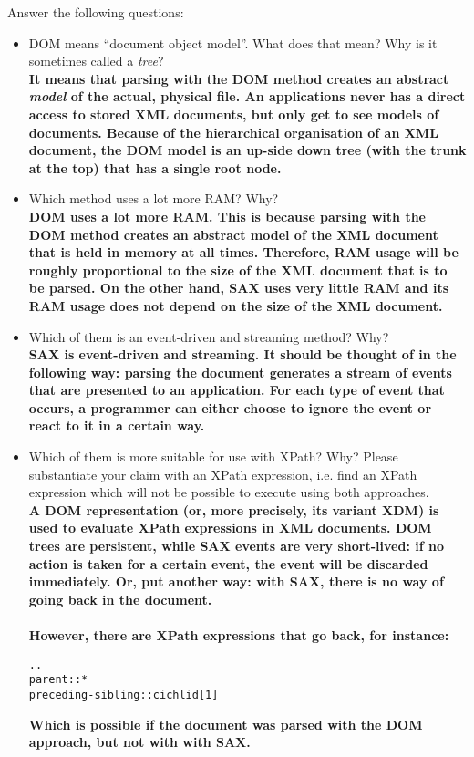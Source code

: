 \documentclass[a4paper, 12pt]{scrartcl}
\begin{document}
Answer the following questions:
\begin{itemize}
\item DOM means ``document object model''. What does that mean? Why is it sometimes called a \textit{tree}?
\vspace{0.5cm} \\
\textbf{It means that parsing with the DOM method creates an abstract \textit{model} of the actual, physical file. An applications never has a direct access to stored XML documents, but only get to see models of documents. Because of the hierarchical organisation of an XML document, the DOM model is an up-side down tree (with the trunk at the top) that has a single root node.}
\item Which method uses a lot more RAM? Why?
\vspace{0.5cm} \\
\textbf{DOM uses a lot more RAM. This is because parsing with the DOM method creates an abstract model of the XML document that is held in memory at all times. Therefore, RAM usage will be roughly proportional to the size of the XML document that is to be parsed. On the other hand, SAX uses very little RAM and its RAM usage does not depend on the size of the XML document.
}
\item Which of them is an event-driven and streaming method? Why?
\vspace{0.5cm} \\
\textbf{SAX is event-driven and streaming. It should be thought of in the following way: parsing the document generates a stream of events that are presented to an application. For each type of event that occurs, a programmer can either choose to ignore the event or react to it in a certain way.
}
\item Which of them is more suitable for use with XPath? Why? Please substantiate your claim with an XPath expression, i.e. find an XPath expression which will not be possible to execute using both approaches.
\vspace{0.5cm} \\
\textbf{A DOM representation (or, more precisely, its variant XDM) is used to evaluate XPath expressions in XML documents. DOM trees are persistent, while SAX events are very short-lived: if no action is taken for a certain event, the event will be discarded immediately. Or, put another way: with SAX, there is no way of going back in the document. \\
\\ However, there are XPath expressions that go back, for instance:}
\lstset{language=XML}
\begin{lstlisting}
..
parent::*
preceding-sibling::cichlid[1]
\end{lstlisting}
\textbf{Which is possible if the document was parsed with the DOM approach, but not with with SAX.}
\end{itemize}
\end{document}
